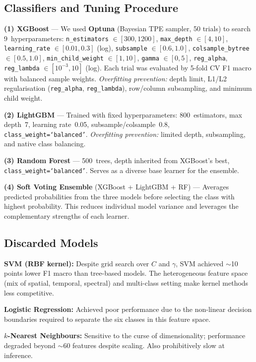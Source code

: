 \documentclass[11pt,a4paper]{article}
\begin{document}
\subsection{Classifiers and Tuning Procedure}

\textbf{(1) XGBoost} --- We used \textbf{Optuna} (Bayesian TPE sampler, 50 trials) to search 9~hyperparameters:
\texttt{n\_estimators} $\in [300, 1200]$,
\texttt{max\_depth} $\in [4, 10]$,
\texttt{learning\_rate} $\in [0.01, 0.3]$ (log),
\texttt{subsample} $\in [0.6, 1.0]$,
\texttt{colsample\_bytree} $\in [0.5, 1.0]$,
\texttt{min\_child\_weight} $\in [1, 10]$,
\texttt{gamma} $\in [0, 5]$,
\texttt{reg\_alpha}, \texttt{reg\_lambda} $\in [10^{-3}, 10]$ (log).
Each trial was evaluated by 5-fold CV F1 macro with balanced sample weights. \textit{Overfitting prevention:} depth limit, L1/L2 regularisation (\texttt{reg\_alpha}, \texttt{reg\_lambda}), row/column subsampling, and minimum child weight.

\textbf{(2) LightGBM} --- Trained with fixed hyperparameters: 800~estimators, max depth~7, learning rate~0.05, subsample/colsample~0.8, \texttt{class\_weight=`balanced'}. \textit{Overfitting prevention:} limited depth, subsampling, and native class balancing.

\textbf{(3) Random Forest} --- 500~trees, depth inherited from XGBoost's best, \texttt{class\_weight=`balanced'}. Serves as a diverse base learner for the ensemble.

\textbf{(4) Soft Voting Ensemble} (XGBoost + LightGBM + RF) --- Averages predicted probabilities from the three models before selecting the class with highest probability. This reduces individual model variance and leverages the complementary strengths of each learner.

\subsection{Discarded Models}
\textbf{SVM (RBF kernel):} Despite grid search over $C$ and $\gamma$, SVM achieved $\sim$10 points lower F1 macro than tree-based models. The heterogeneous feature space (mix of spatial, temporal, spectral) and multi-class setting make kernel methods less competitive.

\textbf{Logistic Regression:} Achieved poor performance due to the non-linear decision boundaries required to separate the six classes in this feature space.

\textbf{$k$-Nearest Neighbours:} Sensitive to the curse of dimensionality; performance degraded beyond ${\sim}60$ features despite scaling. Also prohibitively slow at inference.
\end{document}

